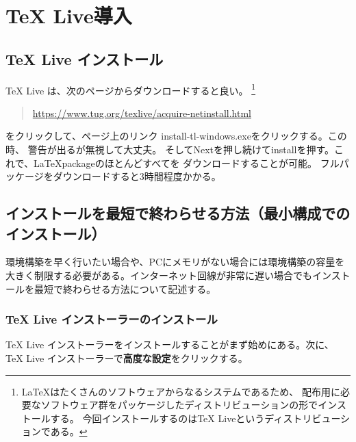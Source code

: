 \documentclass[titlepage]{ltjsarticle}
\begin{document}
\section{TeX Live導入}

\subsection{TeX Live インストール}
TeX Live は、次のページからダウンロードすると良い。
\footnote{
  \LaTeX はたくさんのソフトウェアからなるシステムであるため、
  配布用に必要なソフトウェア群をパッケージしたディストリビューションの形でインストールする。
  今回インストールするのはTeX Liveというディストリビューションである。
}

\begin{quote}
  \centering
  \url{https://www.tug.org/texlive/acquire-netinstall.html}

\end{quote}
をクリックして、ページ上のリンク install-tl-windows.exeをクリックする。この時、
警告が出るが無視して大丈夫。
そしてNextを押し続けてinstallを押す。これで、\LaTeX packageのほとんどすべてを
ダウンロードすることが可能。
フルパッケージをダウンロードすると3時間程度かかる。
\subsection{インストールを最短で終わらせる方法（最小構成でのインストール）}
環境構築を早く行いたい場合や、PCにメモリがない場合には環境構築の容量を大きく制限する必要がある。インターネット回線が非常に遅い場合でもインストールを最短で終わらせる方法について記述する。
\subsubsection{TeX Live インストーラーのインストール}
TeX Live インストーラーをインストールすることがまず始めにある。次に、TeX Live インストーラーで\textbf{高度な設定}をクリックする。
\end{document}
